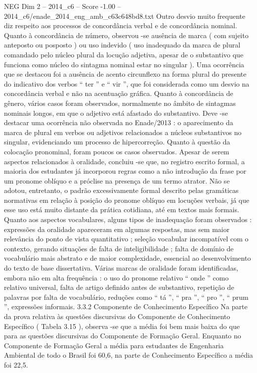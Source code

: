 \begin{textsample}{NEG Dim 2 – 2014\_c6 – Score -1.00 – 2014\_c6/enade\_2014\_eng\_amb\_c63c648bd8.txt}
Outro desvio muito frequente diz respeito aos processos de concordância verbal e de concordância nominal.
Quanto à concordância de número, observou -se ausência de marca ( com sujeito anteposto ou posposto ) ou uso indevido ( uso inadequado da marca de plural comandado pelo núcleo plural da locução adjetiva, apesar de o substantivo que funciona como núcleo do sintagma nominal estar no singular ).
Uma ocorrência que se destacou foi a ausência de acento circunflexo na forma plural do presente do indicativo dos verbos “ ter ” e “ vir ”, que foi considerada como um desvio na concordância verbal e não na acentuação gráfica.
Quanto à concordância de gênero, vários casos foram observados, normalmente no âmbito de sintagmas nominais longos, em que o adjetivo está afastado do substantivo.
Deve -se destacar uma ocorrência não observada no Enade/2013 : o aparecimento da marca de plural em verbos ou adjetivos relacionados a núcleos substantivos no singular, evidenciando um processo de hipercorreção.
Quanto à questão da colocação pronominal, foram poucos os casos observados.
Apesar de serem aspectos relacionados à oralidade, concluiu -se que, no registro escrito formal, a maioria dos estudantes já incorporou regras como a não introdução da frase por um pronome oblíquo e a próclise na presença de um termo atrator.
Não se adotou, entretanto, o padrão excessivamente formal descrito pelas gramáticas normativas em relação à posição do pronome oblíquo em locuções verbais, já que esse uso está muito distante da prática cotidiana, até em textos mais formais.
Quanto aos aspectos vocabulares, alguns tipos de inadequação foram observados : expressões da oralidade apareceram em algumas respostas, mas sem maior relevância do ponto de vista quantitativo ; seleção vocabular incompatível com o contexto, gerando situações de falta de inteligibilidade ; falta de domínio de vocabulário mais abstrato e de maior complexidade, essencial ao desenvolvimento do texto de base dissertativa.
Várias marcas de oralidade foram identificadas, embora não em alta frequência : o uso do pronome relativo “ onde ” como relativo universal, falta de artigo definido antes de substantivo, repetição de palavras por falta de vocabulário, reduções como “ tá ”, “ pra ”, “ pro ”, “ prum ”, expressões informais. 3.3.2 Componente de Conhecimento Específico Na parte da prova relativa às questões discursivas do Componente de Conhecimento Específico ( Tabela 3.15 ), observa -se que a média foi bem mais baixa do que para as questões discursivas do Componente de Formação Geral.
Enquanto no Componente de Formação Geral a média para estudantes de Engenharia Ambiental de todo o Brasil foi 60,6, na parte de Conhecimento Específico a média foi 22,5.

\end{textsample}
